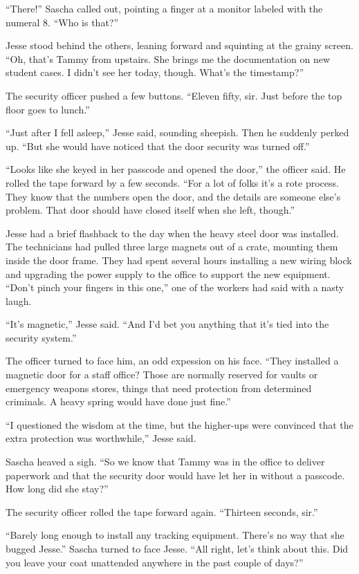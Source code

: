 \documentclass[12pt]{book}
\begin{document}
``There!'' Sascha called out, pointing a finger at a monitor labeled with the numeral 8.  ``Who is that?''

Jesse stood behind the others, leaning forward and squinting at the grainy screen.  ``Oh, that's Tammy from upstairs.  She brings me the documentation on new student cases.  I didn't see her today, though.  What's the timestamp?''

The security officer pushed a few buttons.  ``Eleven fifty, sir.  Just before the top floor goes to lunch.''

``Just after I fell asleep,'' Jesse said, sounding sheepish.  Then he suddenly perked up.  ``But she would have noticed that the door security was turned off.''

``Looks like she keyed in her passcode and opened the door,'' the officer said.  He rolled the tape forward by a few seconds.  ``For a lot of folks it's a rote process.  They know that the numbers open the door, and the details are someone else's problem.  That door should have closed itself when she left, though.''

Jesse had a brief flashback to the day when the heavy steel door was installed.  The technicians had pulled three large magnets out of a crate, mounting them inside the door frame.  They had spent several hours installing a new wiring block and upgrading the power supply to the office to support the new equipment.  ``Don't pinch your fingers in this one,'' one of the workers had said with a nasty laugh.

``It's magnetic,'' Jesse said.  ``And I'd bet you anything that it's tied into the security system.''

The officer turned to face him, an odd expession on his face.  ``They installed a magnetic door for a staff office?  Those are normally reserved for vaults or emergency weapons stores, things that need protection from determined criminals.  A heavy spring would have done just fine.''

``I questioned the wisdom at the time, but the higher-ups were convinced that the extra protection was worthwhile,'' Jesse said.

Sascha heaved a sigh.  ``So we know that Tammy was in the office to deliver paperwork and that the security door would have let her in without a passcode.  How long did she stay?''

The security officer rolled the tape forward again.  ``Thirteen seconds, sir.''

``Barely long enough to install any tracking equipment.  There's no way that she bugged Jesse.''  Sascha turned to face Jesse.  ``All right, let's think about this.  Did you leave your coat unattended anywhere in the past couple of days?''
\end{document}
